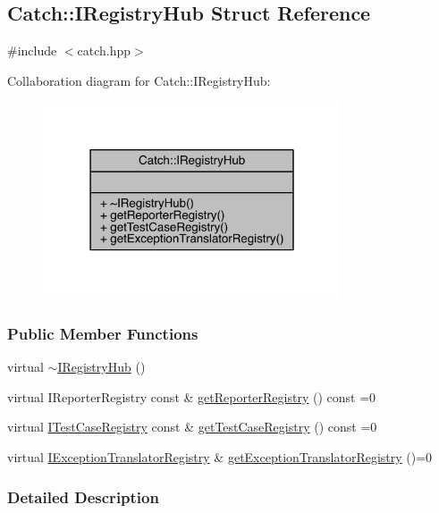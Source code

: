 \hypertarget{a00039}{}\subsection{Catch\+:\+:I\+Registry\+Hub Struct Reference}
\label{a00039}


{\ttfamily \#include $<$catch.\+hpp$>$}



Collaboration diagram for Catch\+:\+:I\+Registry\+Hub\+:\nopagebreak
\begin{figure}[H]
\begin{center}
\leavevmode
\includegraphics[width=250pt]{a00212}
\end{center}
\end{figure}
\subsubsection*{Public Member Functions}
\begin{DoxyCompactItemize}
\item 
virtual \hyperlink{a00039_a050de0f27f96888c8b410992146c9a09}{$\sim$\+I\+Registry\+Hub} ()
\item 
virtual I\+Reporter\+Registry const \& \hyperlink{a00039_a55534563f7ecf7e20ec1e37285ebe54d}{get\+Reporter\+Registry} () const =0
\item 
virtual \hyperlink{a00046}{I\+Test\+Case\+Registry} const \& \hyperlink{a00039_af4f6255f0c0f8f1f179fa9d7d4843076}{get\+Test\+Case\+Registry} () const =0
\item 
virtual \hyperlink{a00033}{I\+Exception\+Translator\+Registry} \& \hyperlink{a00039_a3606988da110c016c5af3ae63454eb78}{get\+Exception\+Translator\+Registry} ()=0
\end{DoxyCompactItemize}


\subsubsection{Detailed Description}


